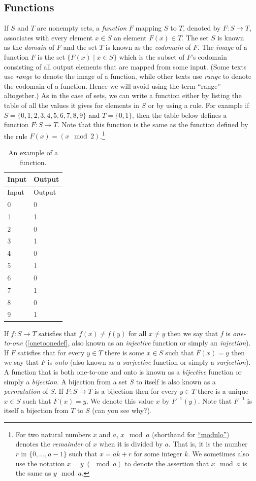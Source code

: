 \subsection{Functions}\label{functionsec}

If \(S\) and \(T\) are nonempty sets, a \emph{function} \(F\) mapping
\(S\) to \(T\), denoted by \(F:S \rightarrow T\), associates with every
element \(x\in S\) an element \(F(x)\in T\). The set \(S\) is known as
the \emph{domain} of \(F\) and the set \(T\) is known as the
\emph{codomain} of \(F\). The \emph{image} of a function \(F\) is the
set \(\{ F(x) \;|\; x\in S\}\) which is the subset of \(F\)'s codomain
consisting of all output elements that are mapped from some input. (Some
texts use \emph{range} to denote the image of a function, while other
texts use \emph{range} to denote the codomain of a function. Hence we
will avoid using the term ``range'' altogether.) As in the case of sets,
we can write a function either by listing the table of all the values it
gives for elements in \(S\) or by using a rule. For example if
\(S = \{0,1,2,3,4,5,6,7,8,9 \}\) and \(T = \{0,1 \}\), then the table
below defines a function \(F: S \rightarrow T\). Note that this function
is the same as the function defined by the rule
\(F(x)= (x \mod 2)\).\footnote{For two natural numbers \(x\) and \(a\),
  \(x \mod a\) (shorthand for \href{https://goo.gl/b7Fdzm}{``modulo''})
  denotes the \emph{remainder} of \(x\) when it is divided by \(a\).
  That is, it is the number \(r\) in \(\{0,\ldots,a-1\}\) such that
  \(x = ak +r\) for some integer \(k\). We sometimes also use the
  notation \(x = y\; (\mod a)\) to denote the assertion that
  \(x \mod a\) is the same as \(y \mod a\).}

\begin{longtable}[]{@{}ll@{}}
\caption{An example of a function.}\tabularnewline
\toprule
Input & Output\tabularnewline
\midrule
\endfirsthead
\toprule
Input & Output\tabularnewline
\midrule
\endhead
0 & 0\tabularnewline
1 & 1\tabularnewline
2 & 0\tabularnewline
3 & 1\tabularnewline
4 & 0\tabularnewline
5 & 1\tabularnewline
6 & 0\tabularnewline
7 & 1\tabularnewline
8 & 0\tabularnewline
9 & 1\tabularnewline
\bottomrule
\end{longtable}

If \(f:S \rightarrow T\) satisfies that \(f(x)\neq f(y)\) for all
\(x \neq y\) then we say that \(f\) is \emph{one-to-one}
(\cref{onetoonedef}, also known as an \emph{injective} function or
simply an \emph{injection}). If \(F\) satisfies that for every
\(y\in T\) there is some \(x\in S\) such that \(F(x)=y\) then we say
that \(F\) is \emph{onto} (also known as a \emph{surjective} function or
simply a \emph{surjection}). A function that is both one-to-one and onto
is known as a \emph{bijective} function or simply a \emph{bijection}. A
bijection from a set \(S\) to itself is also known as a
\emph{permutation} of \(S\). If \(F:S \rightarrow T\) is a bijection
then for every \(y\in T\) there is a unique \(x\in S\) such that
\(F(x)=y\). We denote this value \(x\) by \(F^{-1}(y)\). Note that
\(F^{-1}\) is itself a bijection from \(T\) to \(S\) (can you see why?).

